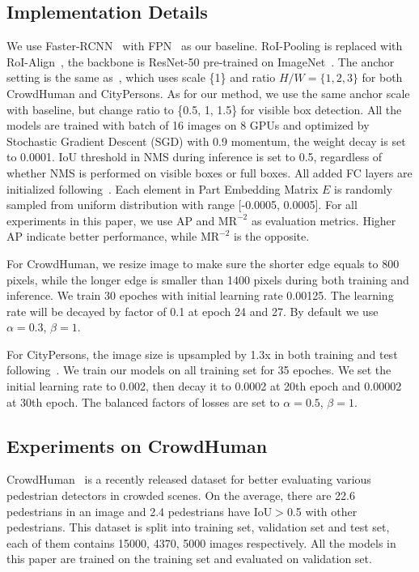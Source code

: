 \documentclass[10pt,twocolumn,letterpaper]{article}
\begin{document}
\subsection{Implementation Details}
We use Faster-RCNN~\cite{ren2015faster} with FPN~\cite{lin2017feature} as our baseline. RoI-Pooling is replaced with RoI-Align~\cite{he2017mask}, the backbone is ResNet-50 pre-trained on ImageNet~\cite{russakovsky2015imagenet}. The anchor setting is the same as~\cite{wang2018repulsion,chu2020crowddet}, which uses scale \{1\} and ratio $H/W=\{1, 2, 3\}$ for both CrowdHuman and CityPersons. As for our method, we use the same anchor scale with baseline, but change ratio to \{0.5, 1, 1.5\} for visible box detection. All the models are trained with batch of 16 images on 8 GPUs and  optimized by Stochastic Gradient Descent (SGD) with 0.9 momentum, the weight decay is set to 0.0001. IoU threshold in NMS during inference is set to 0.5, regardless of whether NMS is performed on visible boxes or full boxes. All added FC layers are initialized following~\cite{lin2017feature}. Each element in Part Embedding Matrix $E$ is randomly sampled from uniform distribution with range [-0.0005, 0.0005]. For all experiments in this paper, we use AP and $\text{MR}^{-2}$ as evaluation metrics. Higher AP indicate better performance, while $\text{MR}^{-2}$ is the opposite.

For CrowdHuman, we resize image to make sure the shorter edge equals to 800 pixels, while the longer edge is smaller than 1400 pixels during both training and inference. We train 30 epoches with initial learning rate 0.00125. The learning rate will be decayed by factor of 0.1 at epoch 24 and 27. By default we use $\alpha=0.3$, $\beta=1$.

For CityPersons, the image size is upsampled by 1.3x in both training and test following~\cite{zhang2017citypersons}. We train our models on all training set for 35 epoches. We set the initial learning rate to 0.002, then decay it to 0.0002 at 20th epoch and 0.00002 at 30th epoch. The balanced factors of losses are set to $\alpha=0.5$, $\beta=1$.

\subsection{Experiments on CrowdHuman}
\label{sec:exp_crowdhuman}
CrowdHuman~\cite{shao2018crowdhuman} is a recently released dataset for better evaluating various pedestrian detectors in crowded scenes. On the average, there are 22.6 pedestrians in an image and 2.4 pedestrians have IoU$>$0.5 with other pedestrians. This dataset is split into training set, validation set and test set, each of them contains 15000, 4370, 5000 images respectively. All the models in this paper are trained on the training set and evaluated on validation set.
\end{document}
